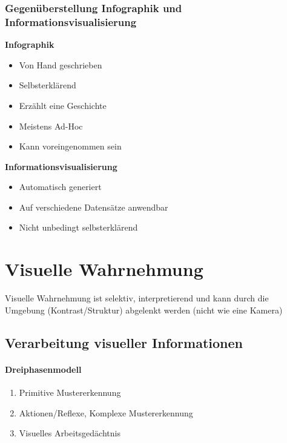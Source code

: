 \documentclass[ngerman]{scrartcl}
\begin{document}
\subsubsection{Gegenüberstellung Infographik und Informationsvisualisierung}

\begin{multicols}{2}%
  \begin{minipage}{0.45\textwidth}
  \textbf{Infographik}
    \begin{itemize}
      \item Von Hand geschrieben
      \item Selbsterklärend
      \item Erzählt eine Geschichte
      \item Meistens Ad-Hoc
      \item Kann voreingenommen sein
    \end{itemize}
  \end{minipage}
  \textbf{Informationsvisualisierung}
    \begin{itemize}
      \item Automatisch generiert
      \item Auf verschiedene Datensätze anwendbar
      \item Nicht unbedingt selbsterklärend
    \end{itemize}
\end{multicols}

\section{Visuelle Wahrnehmung}
Visuelle Wahrnehmung ist selektiv, interpretierend und kann durch die Umgebung (Kontrast/Struktur) abgelenkt werden (nicht wie eine Kamera)

\subsection{Verarbeitung visueller Informationen}

\paragraph{Dreiphasenmodell} 
\begin{enumerate}
  \item Primitive Mustererkennung
  \item Aktionen/Reflexe, Komplexe Mustererkennung
  \item Visuelles Arbeitsgedächtnis
\end{enumerate}
\end{document}
